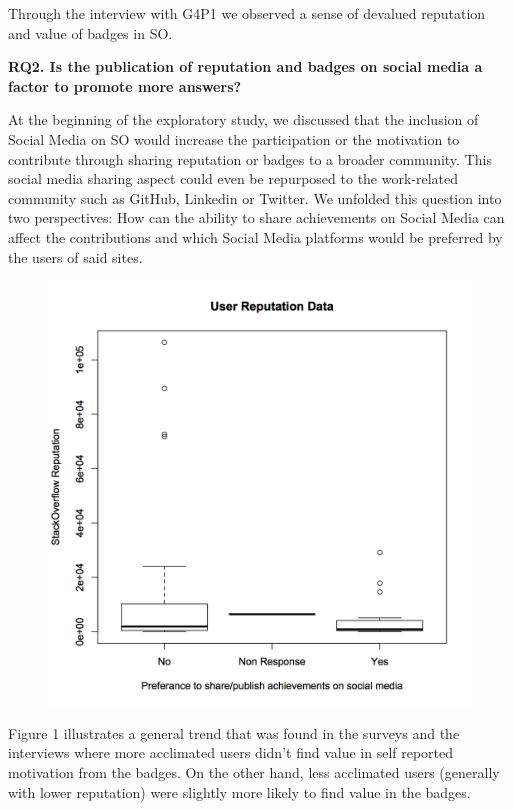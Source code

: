 \documentclass{sigchi}
\begin{document}
Through the interview with G4P1 we observed a sense of devalued reputation and value of badges in SO.

\textbf{RQ2. Is the publication of reputation and badges on social media a factor to promote more answers?}

At the beginning of the exploratory study, we discussed that the inclusion of Social Media on SO would increase the participation or the motivation to contribute through sharing reputation or badges to a broader community. This social media sharing aspect could even be repurposed to the work-related community such as GitHub, Linkedin or Twitter. We unfolded this question into two perspectives: How can the ability to share achievements on Social Media can affect the contributions and which Social Media platforms would be preferred by the users of said sites.

\begin{figure}
	\centering
	\includegraphics[width=0.9\columnwidth]{figures/boxplot_reputation_compare_publish_reputation_bool}
\end{figure}

Figure 1 illustrates a general trend that was found in the surveys and the interviews where more acclimated users didn't find value in self reported motivation from the badges. On the other hand, less acclimated users (generally with lower reputation) were slightly more likely to find value in the badges.
\end{document}
